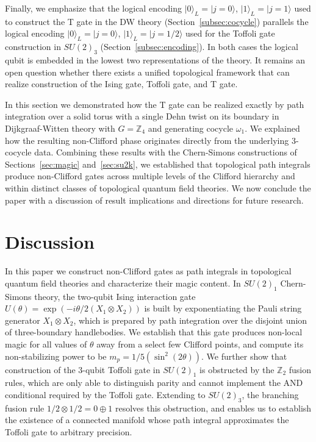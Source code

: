 \documentclass[12pt,a4paper]{article}
\def\ket#1{{|{#1}\rangle}}
\begin{document}
Finally, we emphasize that the logical encoding $\ket{0}_L = \ket{j=0}$, $\ket{1}_L = \ket{j=1}$ used to construct the T gate in the DW theory (Section~\ref{subsec:cocycle}) parallels the logical encoding $\ket{0}_L = \ket{j=0}$, $\ket{1}_L = \ket{j=1/2}$ used for the Toffoli gate construction in $SU(2)_3$ (Section~\ref{subsec:encoding}). In both cases the logical qubit is embedded in the lowest two representations of the theory. It remains an open question whether there exists a unified topological framework that can realize construction of the Ising gate, Toffoli gate, and T gate.

In this section we demonstrated how the T gate can be realized exactly by path integration over a solid torus with a single Dehn twist on its boundary in Dijkgraaf-Witten theory with $G=\mathbb{Z}_4$ and generating cocycle $\omega_1$. We explained how the resulting non-Clifford phase originates directly from the underlying 3-cocycle data. Combining these results with the Chern-Simons constructions of Sections~\ref{sec:magic} and~\ref{sec:su2k}, we established that topological path integrals produce non-Clifford gates across multiple levels of the Clifford hierarchy and within distinct classes of topological quantum field theories. We now conclude the paper with a discussion of result implications and directions for future research.

 
\section{Discussion}\label{sec:discussion}
 

In this paper we construct non-Clifford gates as path integrals in topological quantum field theories and characterize their magic content. In $SU(2)_1$ Chern-Simons theory, the two-qubit Ising interaction gate $U(\theta) = \exp(-i\theta/2 (X_1 \otimes X_2))$ is built by exponentiating the Pauli string generator $X_1 \otimes X_2$, which is prepared by path integration over the disjoint union of three-boundary handlebodies. We establish that this gate produces non-local magic for all values of $\theta$ away from a select few Clifford points, and compute its non-stabilizing power to be $m_p = 1/5(\sin^2(2\theta))$. We further show that construction of the $3$-qubit Toffoli gate in $SU(2)_1$ is obstructed by the $\mathbb{Z}_2$ fusion rules, which are only able to distinguish parity and cannot implement the AND conditional required by the Toffoli gate. Extending to $SU(2)_3$, the branching fusion rule $1/2 \otimes 1/2 = 0 \oplus 1$ resolves this obstruction, and enables us to establish the existence of a connected manifold whose path integral approximates the Toffoli gate to arbitrary precision. 
\end{document}
